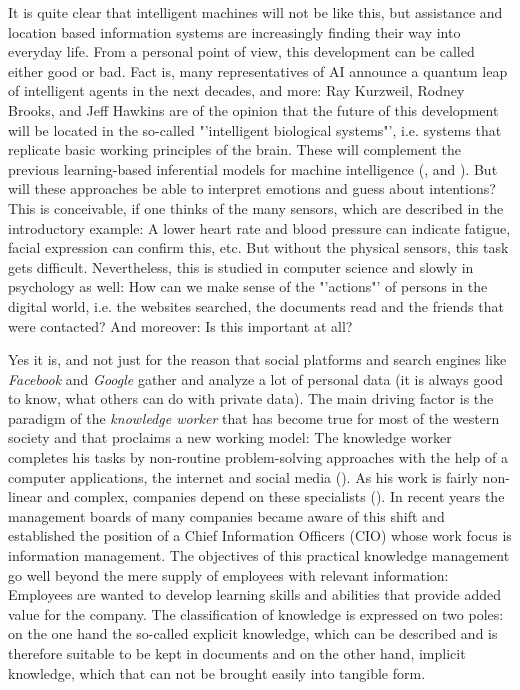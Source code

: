 It is quite clear that intelligent machines will not be like this, but assistance and location based information systems are increasingly finding their way into everyday life. From a personal point of view, this development can be called either good or bad. Fact is, many representatives of \ac{AI} announce a quantum leap of  intelligent agents in the next decades, and more: Ray Kurzweil, Rodney Brooks, and Jeff Hawkins are of the opinion that the future of this development will be located in the so-called "'intelligent biological systems"', i.e. systems that replicate basic working principles of the brain. These will complement the previous learning-based inferential models for machine intelligence (\cite{kurzweil2013create},\cite{hawkins2007intelligence} and \cite{brooks2012brain}). 
But will these approaches be able to interpret emotions and guess about intentions? This is conceivable, if one thinks of the many sensors, which are described in the introductory example: A lower heart rate and blood pressure can indicate fatigue, facial expression can confirm this, etc. But without the physical sensors, this task gets difficult. Nevertheless, this is studied in computer science and slowly in psychology as well: How can we make sense of the "'actions"' of persons in the digital world, i.e. the websites searched, the documents read and the friends that were contacted? And moreover: Is this important at all?

Yes it is, and not just for the reason that social platforms and search engines like \textit{Facebook} and \textit{Google} gather and analyze a lot of personal data (it is always good to know, what others can do with private data). The main driving factor is the paradigm of the \textit{knowledge worker} that has become true for most of the western society and that proclaims a new working model:  The knowledge worker completes his tasks by non-routine problem-solving approaches with the help of a computer applications, the internet and social media (\cite{drucker1999knowledge}). As his work is fairly non-linear and complex, companies depend on these specialists (\cite{foss2006strategy}). In recent years the management boards of many companies became aware of this shift and established the position of a Chief Information Officers (CIO) whose work focus is information management. The objectives of this practical knowledge management go well beyond the mere supply of employees with relevant information: Employees are wanted to develop learning skills and abilities that provide added value for the company. The classification of knowledge is expressed on two poles: on the one hand the so-called explicit knowledge, which can be described and is therefore suitable to be kept in documents and on the other hand, implicit knowledge, which that can not be brought easily into tangible form. 

